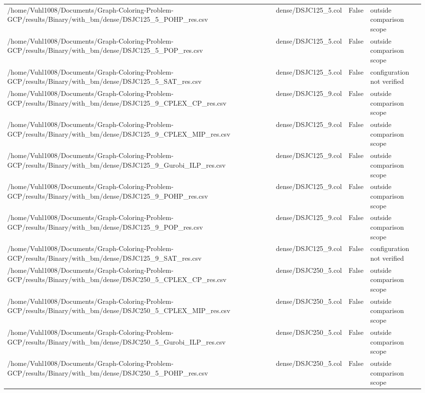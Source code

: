 \begin{table}[htbp]
\begin{tabular}{llll}
/home/Vuhl1008/Documents/Graph-Coloring-Problem-GCP/results/Binary/with\_bm/dense/DSJC125\_5\_POHP\_res.csv & dense/DSJC125\_5.col & False & outside comparison scope \\
/home/Vuhl1008/Documents/Graph-Coloring-Problem-GCP/results/Binary/with\_bm/dense/DSJC125\_5\_POP\_res.csv & dense/DSJC125\_5.col & False & outside comparison scope \\
/home/Vuhl1008/Documents/Graph-Coloring-Problem-GCP/results/Binary/with\_bm/dense/DSJC125\_5\_SAT\_res.csv & dense/DSJC125\_5.col & False & configuration not verified \\
/home/Vuhl1008/Documents/Graph-Coloring-Problem-GCP/results/Binary/with\_bm/dense/DSJC125\_9\_CPLEX\_CP\_res.csv & dense/DSJC125\_9.col & False & outside comparison scope \\
/home/Vuhl1008/Documents/Graph-Coloring-Problem-GCP/results/Binary/with\_bm/dense/DSJC125\_9\_CPLEX\_MIP\_res.csv & dense/DSJC125\_9.col & False & outside comparison scope \\
/home/Vuhl1008/Documents/Graph-Coloring-Problem-GCP/results/Binary/with\_bm/dense/DSJC125\_9\_Gurobi\_ILP\_res.csv & dense/DSJC125\_9.col & False & outside comparison scope \\
/home/Vuhl1008/Documents/Graph-Coloring-Problem-GCP/results/Binary/with\_bm/dense/DSJC125\_9\_POHP\_res.csv & dense/DSJC125\_9.col & False & outside comparison scope \\
/home/Vuhl1008/Documents/Graph-Coloring-Problem-GCP/results/Binary/with\_bm/dense/DSJC125\_9\_POP\_res.csv & dense/DSJC125\_9.col & False & outside comparison scope \\
/home/Vuhl1008/Documents/Graph-Coloring-Problem-GCP/results/Binary/with\_bm/dense/DSJC125\_9\_SAT\_res.csv & dense/DSJC125\_9.col & False & configuration not verified \\
/home/Vuhl1008/Documents/Graph-Coloring-Problem-GCP/results/Binary/with\_bm/dense/DSJC250\_5\_CPLEX\_CP\_res.csv & dense/DSJC250\_5.col & False & outside comparison scope \\
/home/Vuhl1008/Documents/Graph-Coloring-Problem-GCP/results/Binary/with\_bm/dense/DSJC250\_5\_CPLEX\_MIP\_res.csv & dense/DSJC250\_5.col & False & outside comparison scope \\
/home/Vuhl1008/Documents/Graph-Coloring-Problem-GCP/results/Binary/with\_bm/dense/DSJC250\_5\_Gurobi\_ILP\_res.csv & dense/DSJC250\_5.col & False & outside comparison scope \\
/home/Vuhl1008/Documents/Graph-Coloring-Problem-GCP/results/Binary/with\_bm/dense/DSJC250\_5\_POHP\_res.csv & dense/DSJC250\_5.col & False & outside comparison scope \\

\end{tabular}
\end{table}

